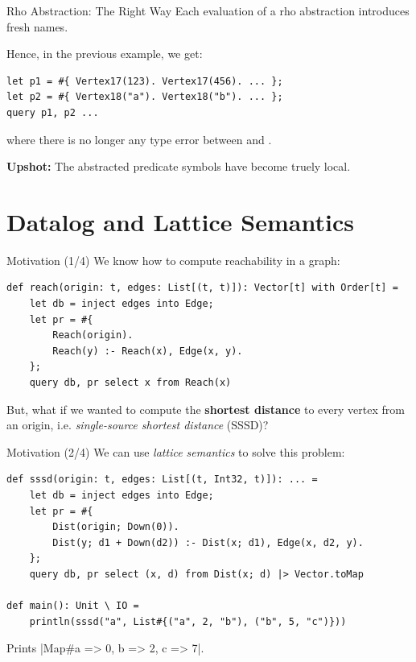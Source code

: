 \begin{frame}[fragile]{Rho Abstraction: The Right Way}
Each evaluation of a rho abstraction introduces fresh names.

Hence, in the previous example, we get:

\begin{lstlisting}[language=flix, xleftmargin=0.8cm]
let p1 = #{ Vertex17(123). Vertex17(456). ... };
let p2 = #{ Vertex18("a"). Vertex18("b"). ... };
query p1, p2 ...
\end{lstlisting}

where there is no longer any type error between  and .

\textbf{Upshot:} The abstracted predicate symbols have become truely local.
\end{frame}

\section{Datalog and Lattice Semantics}

\begin{frame}[fragile]{Motivation (1/4)}
We know how to compute reachability in a graph:

\begin{lstlisting}[language=flix, xleftmargin=0.8cm]
def reach(origin: t, edges: List[(t, t)]): Vector[t] with Order[t] = 
    let db = inject edges into Edge;
    let pr = #{
        Reach(origin).
        Reach(y) :- Reach(x), Edge(x, y).
    };
    query db, pr select x from Reach(x)
\end{lstlisting}

But, what if we wanted to compute the \textbf{shortest distance} to every vertex
from an origin, i.e. \emph{single-source shortest distance} (SSSD)?
\end{frame}

\begin{frame}[fragile]{Motivation (2/4)}
We can use \emph{lattice semantics} to solve this problem:

\begin{lstlisting}[language=flix, xleftmargin=0.8cm]
def sssd(origin: t, edges: List[(t, Int32, t)]): ... = 
    let db = inject edges into Edge;
    let pr = #{
        Dist(origin; Down(0)).
        Dist(y; d1 + Down(d2)) :- Dist(x; d1), Edge(x, d2, y).
    };
    query db, pr select (x, d) from Dist(x; d) |> Vector.toMap

def main(): Unit \ IO = 
    println(sssd("a", List#{("a", 2, "b"), ("b", 5, "c")}))
\end{lstlisting}

Prints \Code|Map#{a => 0, b => 2, c => 7}|.
\end{frame}

